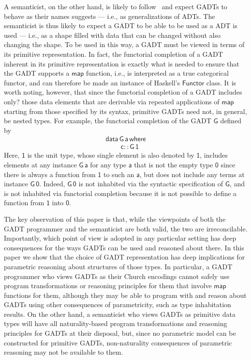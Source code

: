\documentclass[acmsmall,screen,review,anonymous]{acmart}
\theoremstyle{definition}
\begin{document}
A semanticist, on the other hand, is likely to follow~\cite{bfss90}
and expect GADTs to behave as their names suggests --- i.e., as
generalizations of ADTs. The semanticist is thus likely to expect a
GADT to be able to be used as a ADT is used --- i.e., as a shape
filled with data that can be changed without also changing the
shape. To be used in this way, a GADT must be viewed in terms of its
primitive representation. In fact, the functorial completion of a GADT
inherent in its primitive representation is exactly what is needed to
ensure that the GADT supports a $\mathsf{map}$ function, i.e., is
interpreted as a true categorical functor, and can therefore be made
an instance of Haskell's $\mathsf{Functor}$ class. It is worth noting,
however, that since the functorial completion of a GADT includes
{\color{blue} only?} those data elements that are derivable via
repeated applications of $\mathsf{map}$ starting from those specified
by its syntax, primitive GADTs need not, in general, be nested
types. For example, the functorial completion of the GADT $\mathsf{G}$
defined by
\begin{equation}\label{eq:G}
\begin{array}{l}
\mathsf{data\,G\,a\,where}\\
\mathsf{\;\;\;\;\;\;\;\;c :: G\,1}
\end{array}
\end{equation}
Here, $\mathsf{1}$ is the unit type, whose single element is also
denoted by $\mathsf{1}$, includes elements at any instance
$\mathsf{G\,a}$ for any type $\mathsf{a}$ that is not the empty type
$\mathsf{0}$ since there is always a function from $\mathsf{1}$ to
such an $\mathsf{a}$, but does not include any terms at instance
$\mathsf{G\,0}$. Indeed, $\mathsf{G\,0}$ is not inhabited via the
syntactic specification of $\mathsf{G}$, and is not inhabited via
functorial completion because it is not possible to define a function
from $\mathsf{1}$ into $\mathsf{0}$.

The key observation of this paper is that, while the viewpoints of
both the GADT programmer and the semanticist are both valid, the two
are irreconcilable. Importantly, which point of view is adopted in any
particular setting has deep consequences for the ways GADTs can be
used and reasoned about there. In this paper we show that the choice
of GADT representation has deep implications for parametric reasoning
about structures of those types. In particular, a GADT programmer who
views GADTs as their Church encodings cannot safely use program
transformations or reasoning principles for them that involve
$\mathsf{map}$ functions for them, although they may be able to
program with and reason about GADTs using other consequences of
parametricity, such as type inhabitation results. On the other hand, a
semanticist who views GADTs as primitive data types will have all
naturality-based program transformations and reasoning principles for
GADTs at their disposal, but, since no parametric model can be
constructed for primitive GADTs, non-naturality consequences of
parametric reasoning may not be available to them.
\end{document}
